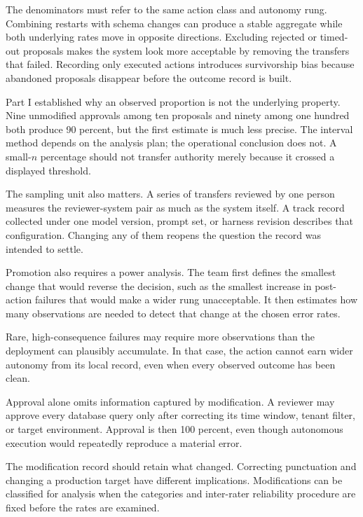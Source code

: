 The denominators must refer to the same action class and autonomy rung. Combining restarts with schema changes can produce a stable aggregate while both underlying rates move in opposite directions. Excluding rejected or timed-out proposals makes the system look more acceptable by removing the transfers that failed. Recording only executed actions introduces survivorship bias because abandoned proposals disappear before the outcome record is built.

Part I established why an observed proportion is not the underlying property. Nine unmodified approvals among ten proposals and ninety among one hundred both produce 90 percent, but the first estimate is much less precise. The interval method depends on the analysis plan; the operational conclusion does not. A small-\(n\) percentage should not transfer authority merely because it crossed a displayed threshold.

The sampling unit also matters. A series of transfers reviewed by one person measures the reviewer-system pair as much as the system itself. A track record collected under one model version, prompt set, or harness revision describes that configuration. Changing any of them reopens the question the record was intended to settle.

Promotion also requires a power analysis. The team first defines the smallest change that would reverse the decision, such as the smallest increase in post-action failures that would make a wider rung unacceptable. It then estimates how many observations are needed to detect that change at the chosen error rates.

Rare, high-consequence failures may require more observations than the deployment can plausibly accumulate. In that case, the action cannot earn wider autonomy from its local record, even when every observed outcome has been clean.

Approval alone omits information captured by modification. A reviewer may approve every database query only after correcting its time window, tenant filter, or target environment. Approval is then 100 percent, even though autonomous execution would repeatedly reproduce a material error.

The modification record should retain what changed. Correcting punctuation and changing a production target have different implications. Modifications can be classified for analysis when the categories and inter-rater reliability procedure are fixed before the rates are examined.

